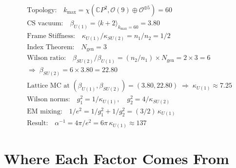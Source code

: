 \documentclass[11pt]{article}
\begin{document}
\begin{equation}
\boxed{
\begin{aligned}
&\text{Topology:}\quad k_{\max} = \chi(\mathbb{C}P^2, \mathcal{O}(9) \oplus \mathcal{O}^{\oplus 5}) = 60 \\
&\text{CS vacuum:}\quad \beta_{U(1)} = \langle k+2 \rangle_{k_{\max}=60} = 3.80 \\
&\text{Frame Stiffness:}\quad \kappa_{U(1)}/\kappa_{SU(2)} = n_1/n_2 = 1/2 \\
&\text{Index Theorem:}\quad N_{\mathrm{gen}} = 3 \\
&\text{Wilson ratio:}\quad \beta_{SU(2)}/\beta_{U(1)} = (n_2/n_1) \times N_{\mathrm{gen}} = 2 \times 3 = 6 \\
&\Rightarrow\; \beta_{SU(2)} = 6 \times 3.80 = 22.80 \\
&\text{Lattice MC at } (\beta_{U(1)},\beta_{SU(2)}) = (3.80, 22.80)
  \;\Rightarrow\; \kappa_{U(1)} \approx 7.25 \\
&\text{Wilson norms:}\quad g_1^2 = 1/\kappa_{U(1)},\quad g_2^2 = 4/\kappa_{SU(2)} \\
&\text{EM mixing:}\quad 1/e^2 = 1/g_1^2 + 1/g_2^2 = (3/2)\,\kappa_{U(1)} \\
&\text{Result:}\quad \alpha^{-1} = 4\pi/e^2 = 6\pi\,\kappa_{U(1)} \approx 137
\end{aligned}
}
\end{equation}

\section{Where Each Factor Comes From}
\end{document}
